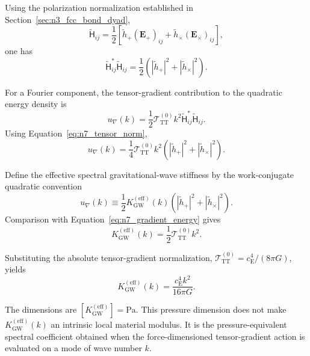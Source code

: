 Using the polarization normalization established in Section~\ref{sec:n3_fcc_bond_dyad},
\begin{equation}
    \widetilde{\mathsf{H}}_{ij} = \frac{1}{2} \left[ \widetilde{h}_{+} (\mathbf{E}_{+})_{ij} + \widetilde{h}_{\times} (\mathbf{E}_{\times})_{ij} \right],
\end{equation}
one has
\begin{equation}
    \widetilde{\mathsf{H}}_{ij}^{*} \widetilde{\mathsf{H}}_{ij} = \frac{1}{2} \left( |\widetilde{h}_{+}|^{2} + |\widetilde{h}_{\times}|^{2} \right).
    \label{eq:n7_tensor_norm}
\end{equation}

For a Fourier component, the tensor-gradient contribution to the quadratic energy density is
\begin{equation}
    u_{\nabla}(k) = \frac{1}{2} \mathcal{T}_{\mathrm{TT}}^{(0)} k^{2} \widetilde{\mathsf{H}}_{ij}^{*} \widetilde{\mathsf{H}}_{ij}.
\end{equation}
Using Equation~\eqref{eq:n7_tensor_norm},
\begin{equation}
    u_{\nabla}(k) = \frac{1}{4} \mathcal{T}_{\mathrm{TT}}^{(0)} k^{2} \left( |\widetilde{h}_{+}|^{2} + |\widetilde{h}_{\times}|^{2} \right).
    \label{eq:n7_gradient_energy}
\end{equation}

Define the effective spectral gravitational-wave stiffness by the work-conjugate quadratic convention
\begin{equation}
    u_{\nabla}(k) \equiv \frac{1}{2} K_{\mathrm{GW}}^{(\mathrm{eff})}(k) \left( |\widetilde{h}_{+}|^{2} + |\widetilde{h}_{\times}|^{2} \right).
    \label{eq:n7_effective_stiffness_definition}
\end{equation}
Comparison with Equation~\eqref{eq:n7_gradient_energy} gives
\begin{equation}
    K_{\mathrm{GW}}^{(\mathrm{eff})}(k) = \frac{1}{2} \mathcal{T}_{\mathrm{TT}}^{(0)} k^{2}.
    \label{eq:n7_effective_stiffness_general}
\end{equation}

Substituting the absolute tensor-gradient normalization, $\mathcal{T}_{\mathrm{TT}}^{(0)} = c_{\mathrm{E}}^{4} / (8\pi G)$, yields
\begin{equation}
    K_{\mathrm{GW}}^{(\mathrm{eff})}(k) = \frac{c_{\mathrm{E}}^{4}k^{2}}{16\pi G}.
    \label{eq:n7_effective_stiffness_k}
\end{equation}

The dimensions are $[K_{\mathrm{GW}}^{(\mathrm{eff})}] = \mathrm{Pa}$. This pressure dimension does not make $K_{\mathrm{GW}}^{(\mathrm{eff})}(k)$ an intrinsic local material modulus. It is the pressure-equivalent spectral coefficient obtained when the force-dimensioned tensor-gradient action is evaluated on a mode of wave number $k$.

